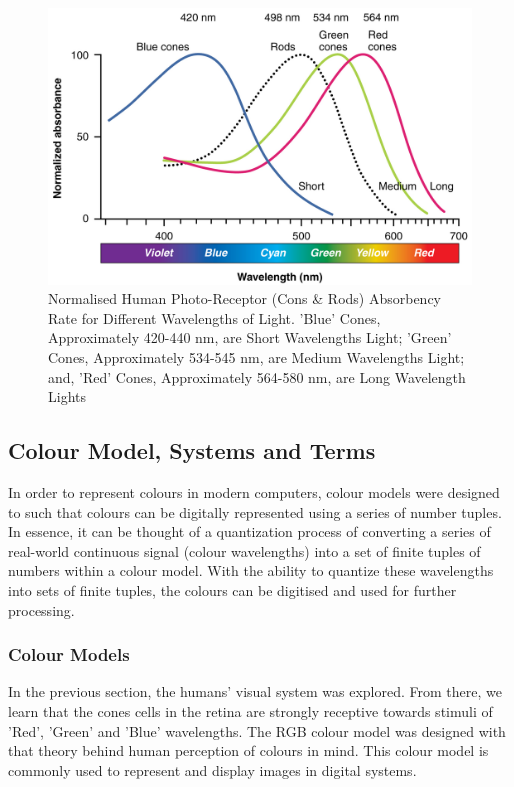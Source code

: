 \begin{figure}[hbt!]
 \centering
 \includegraphics[width=.7\textwidth]{image/lit/ColorSensitivity.jpg}
 \caption[Normalised Human Photo-Receptor Absorbency Rate for Different
 Wavelength Lights]{Normalised Human Photo-Receptor (Cons \& Rods) Absorbency
 Rate for Different Wavelengths of Light. 'Blue' Cones, Approximately 420-440
 nm, are Short Wavelengths Light; 'Green' Cones, Approximately 534-545 nm, are
 Medium Wavelengths Light; and, 'Red' Cones, Approximately 564-580 nm, are Long
 Wavelength Lights }
\label{fig:visibleSpectrum}
\end{figure}


\subsection{Colour Model, Systems and Terms}
\label{section:colourterm}

In order to represent colours in modern computers, colour models were designed
to such that colours can be digitally represented using a series of number
tuples. In essence, it can be thought of a quantization process of converting
a series of real-world continuous signal (colour wavelengths) into a set of
finite tuples of numbers within a colour model. With the ability to quantize
these wavelengths into sets of finite tuples, the colours can be digitised
and used for further processing.


\subsubsection{Colour Models}
In the previous section, the humans' visual system was explored. From there,
we learn that the cones cells in the retina are strongly receptive
towards stimuli of 'Red', 'Green' and 'Blue' wavelengths.
The RGB colour model was designed with that theory behind human perception
of colours in mind. This colour model is commonly used to represent and
display images in digital systems.

